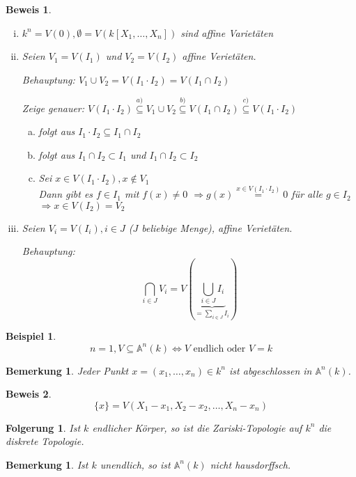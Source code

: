 \documentclass[a4paper, 12pt, numbers=noendperiod, chapterprefix=true]{scrbook}
\theoremstyle{break}
\newtheorem{Bem}[Def]{Bemerkung}
\newtheorem{Folg}[Def]{Folgerung}
\newtheorem{Bsp}[Def]{Beispiel}
\theoremstyle{nonumberbreak}
\newtheorem{Bew}{Beweis}
\theoremstyle{nonumberplain}
\newcommand{\A}{\mathbb{A}}
\begin{document}
\begin{Bew}\begin{enumerate}[i)]
\item
	$k^n=V(0), \emptyset=V(k[X_1,\dots ,X_n])$ sind affine Variet\"aten
\item
	Seien $V_1=V(I_1)$ und $V_2 =V(I_2)$ affine Veriet\"aten.
	
	\emph{Behauptung:} $V_1 \cup V_2 =V(I_1\cdot I_2)=V(I_1\cap I_2)$
	
	Zeige genauer: $V(I_1\cdot I_2) \overset{a)}{\subseteq} V_1 \cup V_2 \overset{b)}{\subseteq} V(I_1\cap I_2) \overset{c)}{\subseteq} V(I_1\cdot I_2)$
	\begin{enumerate}[a)]
	\item[c)] folgt aus $I_1\cdot I_2 \subseteq I_1 \cap I_2$
	\item[b)] folgt aus $I_1 \cap I_2 \subset I_1$ und $I_1 \cap I_2 \subset I_2$
	\item[a)] Sei $x\in V(I_1\cdot I_2), x\notin V_1$\\
		Dann gibt es $f\in I_1$ mit $f(x) \not= 0$ $\Rightarrow  g(x) \stackrel{x\in V(I_1\cdot I_2)}= 0$ f\"ur alle $g\in I_2$ 	$\Rightarrow x\in V(I_2) = V_2$
	\end{enumerate}
\item
	Seien $V_i = V(I_i),i \in J$ ($J$ beliebige Menge), affine Veriet\"aten.
	
	\emph{Behauptung:} \[ \bigcap_{i\in J} V_i = V(\underbrace{\bigcup_{i\in J} I_i}_{= \sum_{i\in J} I_i}) \]
\end{enumerate}\end{Bew}

\begin{Bsp}\[
	n = 1, V \subseteq \A ^n(k) \Leftrightarrow V \textrm{ endlich oder } V=k
\]\end{Bsp}

\begin{Bem}
Jeder Punkt $x=(x_1,\dots ,x_n)\in k^n$ ist abgeschlossen in $\A ^n(k)$.
\end{Bem}

\begin{Bew}\[
\{x\}= V(X_1-x_1,X_2-x_2,\dots ,X_n-x_n)
\]\end{Bew}

\begin{Folg}
Ist $k$ endlicher K\"orper, so ist die Zariski-Topologie auf $k^n$ die diskrete Topologie.
\end{Folg}

\begin{Bem}
Ist $k$ unendlich, so ist $\A ^n(k)$ nicht hausdorffsch.
\end{Bem}
\end{document}

